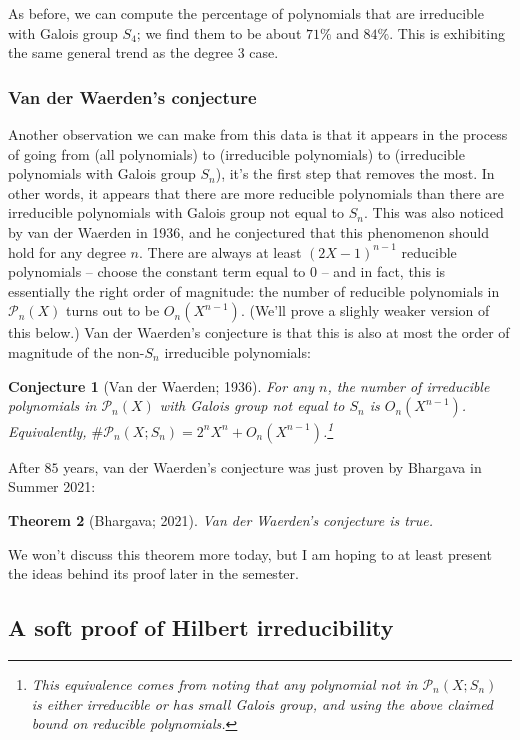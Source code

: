 \documentclass[12pt]{amsart}
\newtheorem{theorem}{Theorem}
\newtheorem{conjecture}[theorem]{Conjecture}
\theoremstyle{definition} \newtheorem*{notation}{Notation}
\theoremstyle{remark} \newtheorem*{remark}{Remark}
\numberwithin{equation}{section}
\numberwithin{theorem}{section}
\begin{document}
	As before, we can compute the percentage of polynomials that are irreducible with Galois group $S_4$; we find them to be about $71\%$ and $84\%$.  This is exhibiting the same general trend as the degree $3$ case.
	
	\subsubsection{Van der Waerden's conjecture}
	Another observation we can make from this data is that it appears in the process of going from (all polynomials) to (irreducible polynomials) to (irreducible polynomials with Galois group $S_n$), it's the first step that removes the most.  In other words, it appears that there are more reducible polynomials than there are irreducible polynomials with Galois group not equal to $S_n$.  This was also noticed by van der Waerden in 1936, and he conjectured that this phenomenon should hold for any degree $n$.  There are always at least $(2X-1)^{n-1}$ reducible polynomials -- choose the constant term equal to $0$ -- and in fact, this is essentially the right order of magnitude: the number of reducible polynomials in $\mathcal{P}_n(X)$ turns out to be $O_n(X^{n-1})$.  (We'll prove a slighly weaker version of this below.)  Van der Waerden's conjecture is that this is also at most the order of magnitude of the non-$S_n$ irreducible polynomials:
	
	\begin{conjecture}[Van der Waerden; 1936]
		For any $n$, the number of irreducible polynomials in $\mathcal{P}_n(X)$ with Galois group not equal to $S_n$ is $O_n(X^{n-1})$.  Equivalently, $\#\mathcal{P}_n(X;S_n) = 2^n X^n + O_n(X^{n-1})$.\footnote{This equivalence comes from noting that any polynomial not in $\mathcal{P}_n(X;S_n)$ is either irreducible or has small Galois group, and using the above claimed bound on reducible polynomials.}
	\end{conjecture}
	
	After $85$ years, van der Waerden's conjecture was just proven by Bhargava in Summer 2021:
	
	\begin{theorem}[Bhargava; 2021]
		Van der Waerden's conjecture is true.
	\end{theorem}
	
	We won't discuss this theorem more today, but I am hoping to at least present the ideas behind its proof later in the semester.

	\subsection{A soft proof of Hilbert irreducibility}
\end{document}
